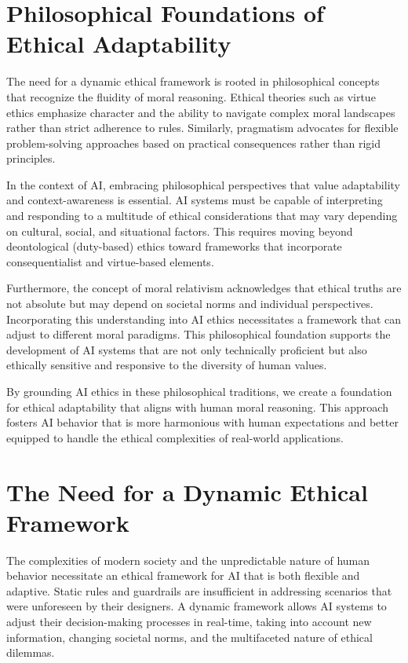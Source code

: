 \documentclass[12pt]{article}
\begin{document}
\newpage


\section{Philosophical Foundations of Ethical Adaptability}

The need for a dynamic ethical framework is rooted in philosophical concepts that recognize the fluidity of moral reasoning. Ethical theories such as virtue ethics emphasize character and the ability to navigate complex moral landscapes rather than strict adherence to rules. Similarly, pragmatism advocates for flexible problem-solving approaches based on practical consequences rather than rigid principles.

In the context of AI, embracing philosophical perspectives that value adaptability and context-awareness is essential. AI systems must be capable of interpreting and responding to a multitude of ethical considerations that may vary depending on cultural, social, and situational factors. This requires moving beyond deontological (duty-based) ethics toward frameworks that incorporate consequentialist and virtue-based elements.

Furthermore, the concept of moral relativism acknowledges that ethical truths are not absolute but may depend on societal norms and individual perspectives. Incorporating this understanding into AI ethics necessitates a framework that can adjust to different moral paradigms. This philosophical foundation supports the development of AI systems that are not only technically proficient but also ethically sensitive and responsive to the diversity of human values.

By grounding AI ethics in these philosophical traditions, we create a foundation for ethical adaptability that aligns with human moral reasoning. This approach fosters AI behavior that is more harmonious with human expectations and better equipped to handle the ethical complexities of real-world applications.

\newpage


\section{The Need for a Dynamic Ethical Framework}

The complexities of modern society and the unpredictable nature of human behavior necessitate an ethical framework for AI that is both flexible and adaptive. Static rules and guardrails are insufficient in addressing scenarios that were unforeseen by their designers. A dynamic framework allows AI systems to adjust their decision-making processes in real-time, taking into account new information, changing societal norms, and the multifaceted nature of ethical dilemmas.
\end{document}
